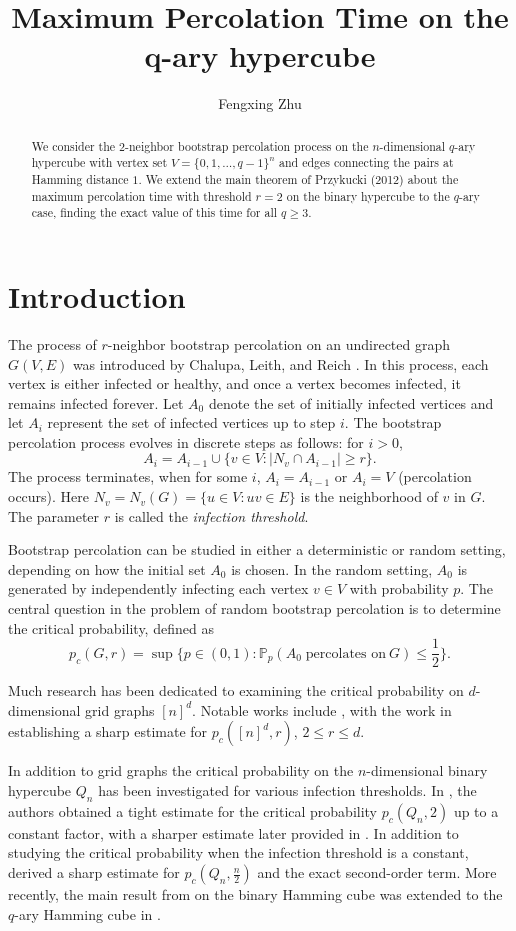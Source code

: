 \documentclass[reqno,11pt]{amsart}
\title[]{Maximum Percolation Time on the q-ary hypercube}
\author[]{Fengxing Zhu}\thanks{Institute for Systems Research and Department of ECE, University of Maryland, College Park, MD 20742, USA, fengxing@terpmail.umd.edu. Supported in part by NSF grant CCF 2330909.}
\renewcommand{\leq}{\leqslant}
\renewcommand{\geq}{\geqslant}
\begin{document}
\begin{abstract}
We consider the $2$-neighbor bootstrap percolation process on the $n$-dimensional $q$-ary hypercube with vertex set $V=\{0,1,\dots,q-1\}^n$ and edges connecting the pairs at Hamming distance $1$. We extend the main theorem of Przykucki (2012) about the maximum percolation time with threshold $r=2$ on the binary hypercube to the $q$-ary case, finding the exact value of this time for all $q \geq 3$. 
\end{abstract}
\maketitle

\section{Introduction}
The process of $r$-neighbor bootstrap percolation on an undirected graph $G(V,E)$ was introduced by Chalupa, Leith, and Reich \cite{Chalupa_1979}. In this process, each vertex is either infected or healthy, and once a vertex becomes infected, it remains infected forever. Let $A_0$ denote the set of initially infected vertices and let $A_i$ represent the set of infected vertices up to step $i$. The bootstrap percolation process evolves in discrete steps as follows: for $i>0$,
$$A_i = A_{i-1} \cup \{v \in V:|N_v \cap A_{i-1}| \geq r \}.$$
The process terminates, when for some $i$, $A_i=A_{i-1}$ or $A_i=V$ (percolation occurs).
Here $N_v=N_v(G)=\{u\in V: uv\in E\}$ is the neighborhood of $v$ in $G$. The parameter $r$ is called the {\em infection threshold}.


Bootstrap percolation can be studied in either a deterministic or random setting, depending on how the initial set $A_0$ is chosen. In the random setting, $A_0$ is generated by independently infecting each vertex $v\in V$ with probability $p$.
The central question in the problem of random bootstrap percolation is to determine the critical probability, defined as
   $$
   p_c(G,r)=\sup\{p \in (0,1): \mathbb{P}_p(A_0 \; \text{percolates on} \: G) \leq \frac{1}{2} \}.
   $$

 Much research has been dedicated to examining the critical probability on $d$-dimensional grid graphs $[n]^d$. Notable works include \cite{Aizenman_1988,Cirillo,CERF200269,Holroyd2002SharpMT},
with the work in \cite{Balogh} establishing a sharp estimate for $p_c([n]^d,r)$, $2 \leq r \leq d$.

In addition to grid graphs the critical probability on the $n$-dimensional binary hypercube $Q_n$ has been investigated for various infection thresholds. In \cite{balogh_bollobas_2006}, the authors obtained a tight estimate for the critical probability $p_c(Q_n,2)$ up to a constant factor, with a sharper estimate later provided in \cite{balogh_bollobas_morris_2010}. In addition to studying the critical probability when the infection threshold is a constant, \cite{balogh_bollobas_morris_2009} derived a sharp estimate for $p_c(Q_n,\frac{n}{2})$ and the exact second-order term. More recently, the main result from \cite{balogh_bollobas_2006} on the binary Hamming cube was extended to the $q$-ary Hamming cube in \cite{kang2024bootstarp}.
\end{document}
